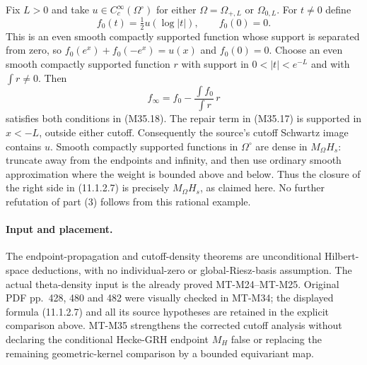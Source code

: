 Fix $L>0$ and take $u\in C_c^\infty(\Omega^\circ)$
for either $\Omega=\Omega_{+,L}$ or $\Omega_{0,L}$.
For $t\ne0$ define
\[
                    f_0(t)=\tfrac12u(\log|t|),
                    \qquad f_0(0)=0.
 \tag{M35.19}
\]
This is an even smooth compactly supported function
whose support is separated from zero, so
$f_0(e^x)+f_0(-e^x)=u(x)$ and $f_0(0)=0$.
Choose an even smooth compactly supported function $r$
with support in $0<|t|<e^{-L}$ and with $\int r\ne0$.
Then
\[
                    f_\infty=f_0-
                            \frac{\int f_0}{\int r}\,r
 \tag{M35.20}
\]
satisfies both conditions in (M35.18).  The repair term
in (M35.17) is supported in $x<-L$, outside either
cutoff.  Consequently the source's cutoff Schwartz
image contains $u$.  Smooth compactly supported
functions in $\Omega^\circ$ are dense in $M_\Omega H_s$:
truncate away from the endpoints and infinity, and then
use ordinary smooth approximation where the weight is
bounded above and below.  Thus the closure of the
right side in (11.1.2.7) is precisely $M_\Omega H_s$,
as claimed here.  No further refutation of part (3)
follows from this rational example.

\paragraph{Input and placement.}
The endpoint-propagation and cutoff-density theorems
are unconditional Hilbert-space deductions, with no
individual-zero or global-Riesz-basis assumption.
The actual theta-density input is the already proved
MT-M24--MT-M25.  Original PDF pp.~428, 480 and 482
were visually checked in MT-M34; the displayed formula
(11.1.2.7) and all its source hypotheses are retained
in the explicit comparison above.  MT-M35 strengthens
the corrected cutoff analysis without declaring the
conditional Hecke-GRH endpoint $M_H$ false or replacing
the remaining geometric-kernel comparison by a bounded
equivariant map.
